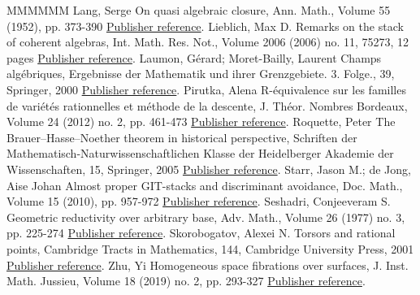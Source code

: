 \documentclass[11pt]{article}
\theoremstyle{definition}
\numberwithin{equation}{section}
\numberwithin{figure}{section}
\numberwithin{table}{section}
\begin{document}
\begin{thebibliography}{MMMMMM}
 Lang, Serge On quasi algebraic closure, Ann. Math., Volume 55 (1952), pp. 373-390 \href{https://ahl.centre-mersenne.org/item/AHL_2020__3__1399_0/#Lang52}{Publisher reference}.
 Lieblich, Max D. Remarks on the stack of coherent algebras, Int. Math. Res. Not., Volume 2006 (2006) no. 11, 75273, 12 pages \href{https://ahl.centre-mersenne.org/item/AHL_2020__3__1399_0/#Lieblich}{Publisher reference}.
 Laumon, Gérard; Moret-Bailly, Laurent Champs algébriques, Ergebnisse der Mathematik und ihrer Grenzgebiete. 3. Folge., 39, Springer, 2000 \href{https://ahl.centre-mersenne.org/item/AHL_2020__3__1399_0/#LM-B}{Publisher reference}.
 Pirutka, Alena R-équivalence sur les familles de variétés rationnelles et méthode de la descente, J. Théor. Nombres Bordeaux, Volume 24 (2012) no. 2, pp. 461-473 \href{https://ahl.centre-mersenne.org/item/AHL_2020__3__1399_0/#Pirutka}{Publisher reference}.
 Roquette, Peter The Brauer–Hasse–Noether theorem in historical perspective, Schriften der Mathematisch-Naturwissenschaftlichen Klasse der Heidelberger Akademie der Wissenschaften, 15, Springer, 2005 \href{https://ahl.centre-mersenne.org/item/AHL_2020__3__1399_0/#Roquette}{Publisher reference}.
 Starr, Jason M.; de Jong, Aise Johan Almost proper GIT-stacks and discriminant avoidance, Doc. Math., Volume 15 (2010), pp. 957-972 \href{https://ahl.centre-mersenne.org/item/AHL_2020__3__1399_0/#dJS8}{Publisher reference}.
 Seshadri, Conjeeveram S. Geometric reductivity over arbitrary base, Adv. Math., Volume 26 (1977) no. 3, pp. 225-274 \href{https://ahl.centre-mersenne.org/item/AHL_2020__3__1399_0/#Sesh}{Publisher reference}.
 Skorobogatov, Alexei N. Torsors and rational points, Cambridge Tracts in Mathematics, 144, Cambridge University Press, 2001 \href{https://ahl.centre-mersenne.org/item/AHL_2020__3__1399_0/#Sk}{Publisher reference}.
 Zhu, Yi Homogeneous space fibrations over surfaces, J. Inst. Math. Jussieu, Volume 18 (2019) no. 2, pp. 293-327 \href{https://ahl.centre-mersenne.org/item/AHL_2020__3__1399_0/#Zhu}{Publisher reference}.
\end{thebibliography}
\end{document}

